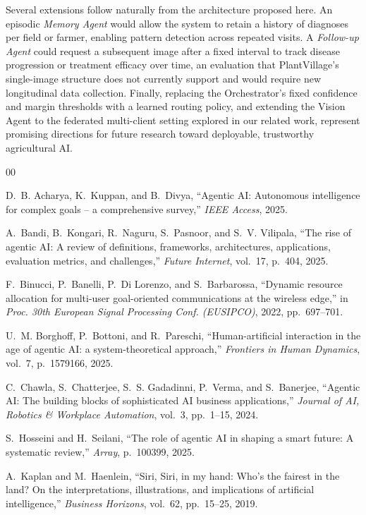 \documentclass[conference]{IEEEtran}
\begin{document}
Several extensions follow naturally from the architecture proposed here. An episodic \emph{Memory Agent} would allow the system to retain a history of diagnoses per field or farmer, enabling pattern detection across repeated visits. A \emph{Follow-up Agent} could request a subsequent image after a fixed interval to track disease progression or treatment efficacy over time, an evaluation that PlantVillage's single-image structure does not currently support and would require new longitudinal data collection. Finally, replacing the Orchestrator's fixed confidence and margin thresholds with a learned routing policy, and extending the Vision Agent to the federated multi-client setting explored in our related work, represent promising directions for future research toward deployable, trustworthy agricultural AI.

\begin{thebibliography}{00}

 D.~B. Acharya, K.~Kuppan, and B.~Divya, ``Agentic AI: Autonomous intelligence for complex goals -- a comprehensive survey,'' \emph{IEEE Access}, 2025.

 A.~Bandi, B.~Kongari, R.~Naguru, S.~Pasnoor, and S.~V. Vilipala, ``The rise of agentic AI: A review of definitions, frameworks, architectures, applications, evaluation metrics, and challenges,'' \emph{Future Internet}, vol.~17, p.~404, 2025.

 F.~Binucci, P.~Banelli, P.~Di Lorenzo, and S.~Barbarossa, ``Dynamic resource allocation for multi-user goal-oriented communications at the wireless edge,'' in \emph{Proc. 30th European Signal Processing Conf. (EUSIPCO)}, 2022, pp.~697--701.

 U.~M. Borghoff, P.~Bottoni, and R.~Pareschi, ``Human-artificial interaction in the age of agentic AI: a system-theoretical approach,'' \emph{Frontiers in Human Dynamics}, vol.~7, p.~1579166, 2025.

 C.~Chawla, S.~Chatterjee, S.~S. Gadadinni, P.~Verma, and S.~Banerjee, ``Agentic AI: The building blocks of sophisticated AI business applications,'' \emph{Journal of AI, Robotics \& Workplace Automation}, vol.~3, pp.~1--15, 2024.

 S.~Hosseini and H.~Seilani, ``The role of agentic AI in shaping a smart future: A systematic review,'' \emph{Array}, p.~100399, 2025.

 A.~Kaplan and M.~Haenlein, ``Siri, Siri, in my hand: Who's the fairest in the land? On the interpretations, illustrations, and implications of artificial intelligence,'' \emph{Business Horizons}, vol.~62, pp.~15--25, 2019.


\end{thebibliography}
\end{document}
